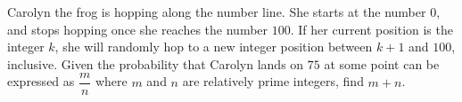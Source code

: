Carolyn the frog is hopping along the number line. She starts at the number $0$, and stops hopping once she reaches the number $100$. If her current position is the integer $k$, she will randomly hop to a new integer position between $k+1$ and $100$, inclusive. Given the probability that Carolyn lands on $75$ at some point can be expressed as $\dfrac{m}{n}$ where $m$ and $n$ are relatively prime integers, find $m+n$.
